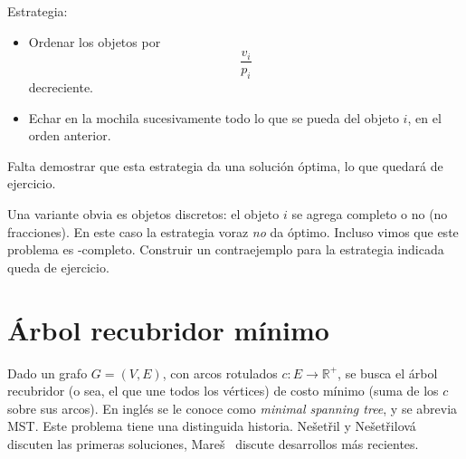   Estrategia:
  \begin{itemize}
  \item
    Ordenar los objetos por
    \begin{equation*}
      \frac{v_i}{p_i}
    \end{equation*}
    decreciente.
  \item
    Echar en la mochila sucesivamente todo lo que se pueda del objeto \(i\),
    en el orden anterior.
  \end{itemize}

  Falta demostrar que esta estrategia da una solución óptima,
  lo que quedará de ejercicio.

  Una variante obvia es objetos discretos:
  el objeto \(i\) se agrega completo o no
  (no fracciones).
  En este caso la estrategia voraz \emph{no} da óptimo.
  Incluso vimos que este problema es \NP\nobreakdash-completo.
  Construir un contraejemplo para la estrategia indicada queda de ejercicio.

\section{Árbol recubridor mínimo}
\label{sec:MST}

  Dado un grafo \(G = (V, E)\),
  con arcos rotulados \(c \colon E \to \mathbb{R}^+\),
  se busca el árbol recubridor
  (o sea,
   el que une todos los vértices)
  de costo mínimo
  (suma de los \(c\) sobre sus arcos).
  En inglés se le conoce
  como \emph{\foreignlanguage{english}{minimal spanning tree}},
  y se abrevia MST.
  Este problema tiene una distinguida historia.
  Nešetřil y Nešetřilová~%
    \cite{nesetril12:_origin_mst_algorithms}
  discuten las primeras soluciones,
  Mareš~%
    \cite{mares08:_saga_mst}
  discute desarrollos más recientes.

